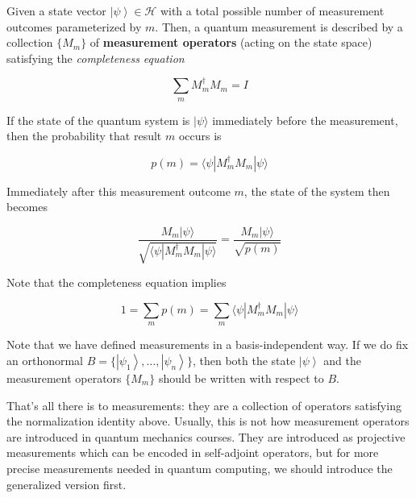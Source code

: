 \documentclass{article}
\newcommand{\ket}[1]{\ensuremath{\left|#1\right\rangle}}
\newcounter{theorem}[section]
\newcounter{code}[section]
\begin{document}
      \begin{theorem}
        \label{thm:posulate-3-general-measurement}
        Given a state vector $\ket{\psi} \in \mathcal{H}$ with a total possible number of measurement outcomes parameterized by $m$. Then, a quantum measurement is described by a collection $\{M_m\}$ of \textbf{measurement operators} (acting on the state space) satisfying the \textit{completeness equation}

          \begin{equation}
            \sum_{m} M_m^\dagger M_m = I
          \end{equation}

        If the state of the quantum system is $|\psi \rangle$ immediately before the measurement, then the probability that result $m$ occurs is

          \begin{equation}
            p(m) = \langle \psi | M_m^\dagger M_m | \psi \rangle
          \end{equation}

        Immediately after this measurement outcome $m$, the state of the system then becomes

          \begin{equation}
            \frac{M_m |\psi \rangle}{\sqrt{\langle \psi| M_m^\dagger M_m |\psi \rangle}} = \frac{M_m |\psi \rangle}{\sqrt{p(m)}}
          \end{equation}

        Note that the completeness equation implies

          \begin{equation}
            1 = \sum_m p(m) = \sum_m \langle \psi | M_m^\dagger M_m | \psi \rangle
          \end{equation}

        Note that we have defined measurements in a basis-independent way. If we do fix an orthonormal $B = \{ \ket{\psi_1}, \ldots, \ket{\psi_n}\}$, then both the state $\ket{\psi}$ and the measurement operators $\{M_m\}$ should be written with respect to $B$. 
      \end{theorem}

      That's all there is to measurements: they are a collection of operators satisfying the normalization identity above. Usually, this is not how measurement operators are introduced in quantum mechanics courses. They are introduced as projective measurements which can be encoded in self-adjoint operators, but for more precise measurements needed in quantum computing, we should introduce the generalized version first. 
\end{document}
